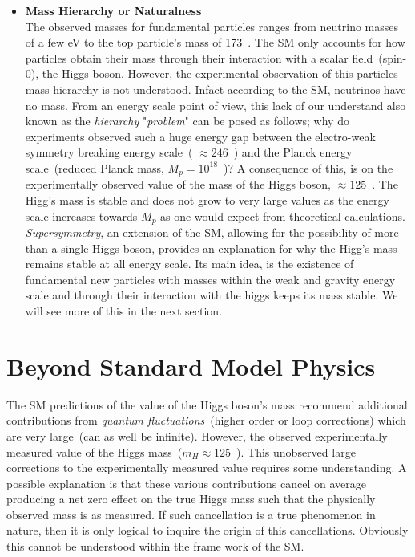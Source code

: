 \begin{itemize}
\item \textbf{Mass Hierarchy or Naturalness} \mbox{}\\
The observed masses  for fundamental particles ranges from neutrino masses of a few eV to the \textsf{top} particle's mass of 173~\GeV. The SM only accounts for how particles obtain their mass through their interaction with a scalar field~(spin-0), the Higgs boson. However, the experimental observation of this particles mass hierarchy is not understood. Infact according to the SM, neutrinos have no mass. 
From an energy scale point of view, this lack of our understand also known as the \textit{hierarchy} "\textit{problem}" can be posed as follows; why do experiments observed such a huge energy gap between the electro-weak symmetry breaking energy scale~( $\approx 246$~\GeV) and the Planck energy scale~(reduced Planck mass, $M_{p} = 10^{18}$~\GeV)?
A consequence of this, is on the experimentally observed value of the mass of the Higgs boson, $\approx 125$~\GeV. The Higg's mass is stable and does not grow to very large values as the energy scale increases towards $M_{p}$ as one would expect from theoretical calculations.  \textit{Supersymmetry}, an extension of the SM, allowing for the possibility of more than a single Higgs boson, provides an explanation for why the  Higg's mass remains stable at all energy scale. Its main idea, is the existence of fundamental new particles with masses within the weak and gravity energy scale and through their interaction with the higgs keeps its mass stable. We will see more of this in the next section.
\end{itemize}

\section{Beyond Standard Model Physics}
The SM predictions of the value of the Higgs boson's mass recommend additional contributions from \textit{quantum fluctuations}~(higher order or loop corrections) which are very large~(can as well be infinite). However, the observed experimentally measured value of the Higgs mass~($m_{H} \approx 125$~\GeV). This unobserved large corrections to the experimentally measured value requires some understanding. A possible explanation is that these various contributions cancel on average producing a net zero effect on the true Higgs mass such that the physically observed mass is as measured. If such cancellation is a true phenomenon in nature, then it is only logical to inquire the origin of this cancellations. Obviously this cannot be understood within the frame work of the SM. 

